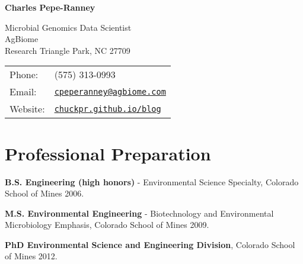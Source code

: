 \documentclass[letterpaper]{article}
\def\name{\textbf{Charles Pepe-Ranney}}
\renewenvironment{itemize}{
  \begin{list}{}{
    \setlength{\leftmargin}{1.5em}
  }
}{
  \end{list}
}
\begin{document}
{\Large \name}


\vspace{0.125in}

\begin{minipage}{0.45\linewidth}
  Microbial Genomics Data Scientist \\
  AgBiome \\
  Research Triangle Park, NC 27709
\end{minipage}
\begin{minipage}{0.45\linewidth}
  \begin{tabular}{ll}
    Phone: & (575) 313-0993 \\
    Email: & \href{mailto:cpeperanney@agbiome.com}{\tt cpeperanney@agbiome.com} \\
    Website: & \href{http://chuckpr.github.io/blog}{\tt chuckpr.github.io/blog} 
  \end{tabular}
\end{minipage}
\section*{Professional Preparation}
\begin{itemize}
    \item \textbf{B.S. Engineering (high honors)} - Environmental Science Specialty, Colorado School of Mines 2006.
    \item \textbf{M.S. Environmental Engineering} - Biotechnology and Environmental Microbiology Emphasis, Colorado School of Mines 2009.
    \item \textbf{PhD Environmental Science and Engineering Division}, Colorado School of Mines 2012.
\end{itemize}
\end{document}
